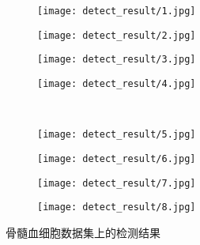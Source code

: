 \begin{figure}[htb]
	\centering
  \begin{subfigure}{0.24\linewidth}
    \centering
    \texttt{[image: detect\_result/1.jpg]}
  \end{subfigure}
	\centering
  \begin{subfigure}{0.24\linewidth}
    \centering
    \texttt{[image: detect\_result/2.jpg]}
  \end{subfigure}
		\centering
  \begin{subfigure}{0.24\linewidth}
    \centering
    \texttt{[image: detect\_result/3.jpg]}
  \end{subfigure}
		\centering
  \begin{subfigure}{0.24\linewidth}
    \centering
    \texttt{[image: detect\_result/4.jpg]}
  \end{subfigure}
\\	
\vspace{0.2cm}
	\centering
  \begin{subfigure}{0.24\linewidth}
    \centering
    \texttt{[image: detect\_result/5.jpg]}
  \end{subfigure}
		\centering
  \begin{subfigure}{0.24\linewidth}
    \centering
    \texttt{[image: detect\_result/6.jpg]}
  \end{subfigure}
		\centering
  \begin{subfigure}{0.24\linewidth}
    \centering
    \texttt{[image: detect\_result/7.jpg]}
  \end{subfigure}
		\centering
  \begin{subfigure}{0.24\linewidth}
    \centering
    \texttt{[image: detect\_result/8.jpg]}
  \end{subfigure}
  \caption{骨髓血细胞数据集上的检测结果}
	\label{fig:detect_res}
\end{figure}

